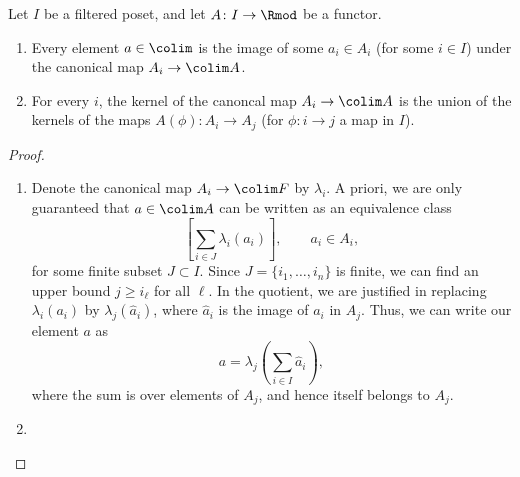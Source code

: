 \documentclass[main.tex]{subfiles}
\begin{document}
\begin{lemma}
  \label{lemma:properties_of_filtered_colimit}
  Let $I$ be a filtered poset, and let $A\colon I \to \Rmod$ be a functor.
  \begin{enumerate}
    \item Every element $a \in \colim$ is the image of some $a_{i} \in A_{i}$ (for some $i \in I$) under the canonical map $A_{i} \to \colim A$.

    \item For every $i$, the kernel of the canoncal map $A_{i} \to \colim A$ is the union of the kernels of the maps $A(\phi)\colon A_{i} \to A_{j}$ (for $\phi\colon i \to j$ a map in $I$).
  \end{enumerate}
\end{lemma}
\begin{proof}
  \leavevmode
  \begin{enumerate}
    \item Denote the canonical map \(A_{i} \to \colim F\) by \(\lambda_{i}\). A priori, we are only guaranteed that $a \in \colim A$ can be written as an equivalence class
      \begin{equation*}
        \left[ \sum_{i \in J} \lambda_{i}(a_{i}) \right],\qquad a_{i} \in A_{i},
      \end{equation*}
      for some finite subset $J \subset I$. Since $J = \{i_{1}, \ldots, i_{n}\}$ is finite, we can find an upper bound $j \geq i_{\ell}$ for all $\ell$. In the quotient, we are justified in replacing \(\lambda_{i}(a_{i})\) by \(\lambda_{j}(\hat{a}_{i})\), where \(\hat{a}_{i}\) is the image of \(a_{i}\) in \(A_{j}\). Thus, we can write our element \(a\) as
      \begin{equation*}
        a = \lambda_{j}\left(\sum_{i \in I}\hat{a}_{i}\right),
      \end{equation*}
      where the sum is over elements of \(A_{j}\), and hence itself belongs to \(A_{j}\).

    \item 
  \end{enumerate}
\end{proof}
\end{document}
